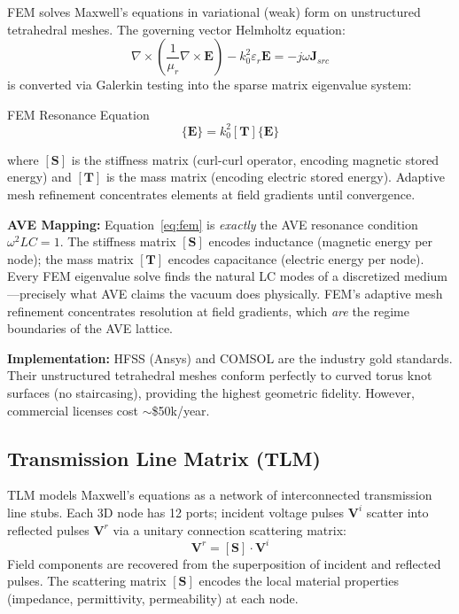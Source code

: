 FEM solves Maxwell's equations in variational (weak) form on unstructured tetrahedral meshes. The governing vector Helmholtz equation:
\begin{equation}
    \nabla \times \left(\frac{1}{\mu_r} \nabla \times \mathbf{E}\right) - k_0^2 \varepsilon_r \mathbf{E} = -j\omega \mathbf{J}_{src}
\end{equation}
is converted via Galerkin testing into the sparse matrix eigenvalue system:
\begin{resultbox}{FEM Resonance Equation}
\begin{equation}
    [\mathbf{S}]\{\mathbf{E}\} = k_0^2 [\mathbf{T}]\{\mathbf{E}\}
    \label{eq:fem}
\end{equation}
\end{resultbox}
where $[\mathbf{S}]$ is the stiffness matrix (curl-curl operator, encoding magnetic stored energy) and $[\mathbf{T}]$ is the mass matrix (encoding electric stored energy). Adaptive mesh refinement concentrates elements at field gradients until convergence.

\textbf{AVE Mapping:} Equation~\ref{eq:fem} is \textit{exactly} the AVE resonance condition $\omega^2 LC = 1$. The stiffness matrix $[\mathbf{S}]$ encodes inductance (magnetic energy per node); the mass matrix $[\mathbf{T}]$ encodes capacitance (electric energy per node). Every FEM eigenvalue solve finds the natural LC modes of a discretized medium---precisely what AVE claims the vacuum does physically. FEM's adaptive mesh refinement concentrates resolution at field gradients, which \textit{are} the regime boundaries of the AVE lattice.

\textbf{Implementation:} HFSS (Ansys) and COMSOL are the industry gold standards. Their unstructured tetrahedral meshes conform perfectly to curved torus knot surfaces (no staircasing), providing the highest geometric fidelity. However, commercial licenses cost $\sim$\$50k/year.

\subsection{Transmission Line Matrix (TLM)}

TLM models Maxwell's equations as a network of interconnected transmission line stubs. Each 3D node has 12 ports; incident voltage pulses $\mathbf{V}^i$ scatter into reflected pulses $\mathbf{V}^r$ via a unitary connection scattering matrix:
\begin{equation}
    \mathbf{V}^{r} = [\mathbf{S}] \cdot \mathbf{V}^{i}
\end{equation}
Field components are recovered from the superposition of incident and reflected pulses. The scattering matrix $[\mathbf{S}]$ encodes the local material properties (impedance, permittivity, permeability) at each node.

